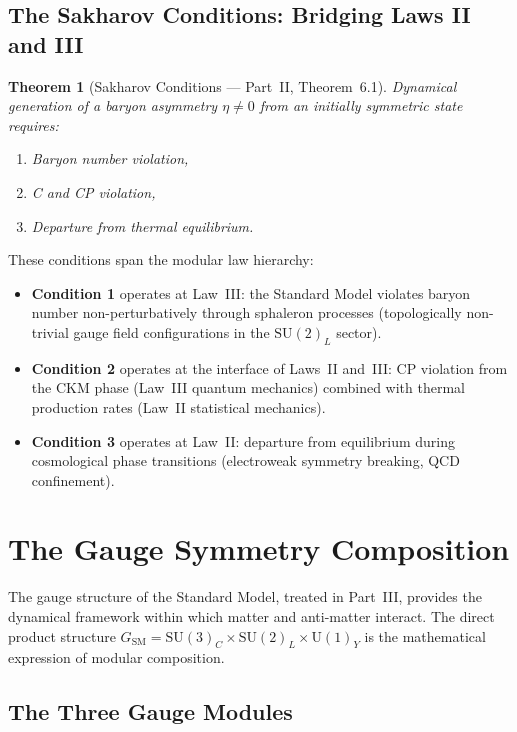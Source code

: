 \documentclass[12pt]{article}
\newtheorem{theorem}{Theorem}[section]
\theoremstyle{definition}
\theoremstyle{remark}
\newcommand{\su}[1]{\mathrm{SU}(#1)}
\newcommand{\uu}[1]{\mathrm{U}(#1)}
\begin{document}
\subsection{The Sakharov Conditions: Bridging Laws II and III}

\begin{theorem}[Sakharov Conditions --- Part~II, Theorem~6.1]
\label{thm:sakharov}
Dynamical generation of a baryon asymmetry $\eta \neq 0$ from an initially symmetric state requires:
\begin{enumerate}
\item Baryon number violation,
\item C and CP violation,
\item Departure from thermal equilibrium.
\end{enumerate}
\end{theorem}

These conditions span the modular law hierarchy:

\begin{itemize}
\item \textbf{Condition 1} operates at Law~III: the Standard Model violates baryon number non-perturbatively through sphaleron processes (topologically non-trivial gauge field configurations in the $\su{2}_L$ sector).
\item \textbf{Condition 2} operates at the interface of Laws~II and~III: CP violation from the CKM phase (Law~III quantum mechanics) combined with thermal production rates (Law~II statistical mechanics).
\item \textbf{Condition 3} operates at Law~II: departure from equilibrium during cosmological phase transitions (electroweak symmetry breaking, QCD confinement).
\end{itemize}


\section{The Gauge Symmetry Composition}
\label{sec:gauge-composition}

The gauge structure of the Standard Model, treated in Part~III, provides the dynamical framework within which matter and anti-matter interact. The direct product structure $G_{\mathrm{SM}} = \su{3}_C \times \su{2}_L \times \uu{1}_Y$ is the mathematical expression of modular composition.

\subsection{The Three Gauge Modules}
\end{document}
